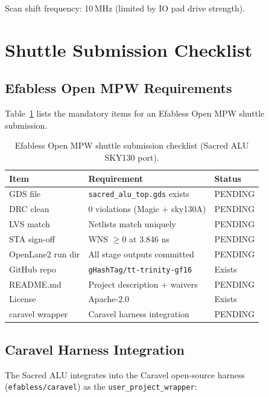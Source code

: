 Scan shift frequency: 10\,MHz (limited by IO pad drive strength).

\section{Shuttle Submission Checklist}
\label{sec:72:shuttle-checklist}

\subsection{Efabless Open MPW Requirements}
\label{subsec:72:shuttle-reqs}

Table~\ref{tab:72:shuttle-checklist} lists the mandatory items for
an Efabless Open MPW shuttle submission.

\begin{table}[H]
\centering
\caption{Efabless Open MPW shuttle submission checklist
  (Sacred ALU SKY130 port).}
\label{tab:72:shuttle-checklist}
\small
\begin{tabular}{lll}
\toprule
Item & Requirement & Status \\
\midrule
GDS file            & \texttt{sacred\_alu\_top.gds} exists & PENDING \\
DRC clean           & 0 violations (Magic + sky130A)       & PENDING \\
LVS match           & Netlists match uniquely              & PENDING \\
STA sign-off        & WNS $\ge 0$ at 3.846 ns             & PENDING \\
OpenLane2 run dir   & All stage outputs committed          & PENDING \\
GitHub repo         & \texttt{gHashTag/tt-trinity-gf16}    & Exists \\
README.md           & Project description + waivers        & PENDING \\
License             & Apache-2.0                           & Exists \\
caravel wrapper     & Caravel harness integration          & PENDING \\
\bottomrule
\end{tabular}
\end{table}

\subsection{Caravel Harness Integration}
\label{subsec:72:caravel}

The Sacred ALU integrates into the Caravel open-source harness
(\texttt{efabless/caravel}) as the \texttt{user\_project\_wrapper}:

